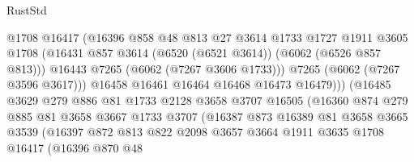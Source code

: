 \begin{lexlean}{RustStd}
\begin{coremodule}
                                @1708
                                @16417
                                (@16396
                                  @858
                                  @48
                                  @813
                                  @27
                                  @3614
                                  @1733
                                  @1727
                                  @1911
                                  @3605
                                  @1708
                                  (@16431
                                    @857
                                    @3614
                                    (@6520 (@6521 @3614))
                                    (@6062 (@6526 @857 @813)))
                                  @16443
                                  @7265
                                  (@6062 (@7267 @3606 @1733)))
                                @7265
                                (@6062 (@7267 @3596 @3617)))
                              @16458
                              @16461
                              @16464
                              @16468
                              @16473
                              @16479)))
                        (@16485
                          @3629
                          @279
                          @886
                          @81
                          @1733
                          @2128
                          @3658
                          @3707
                          @16505
                          (@16360
                            @874
                            @279
                            @885
                            @81
                            @3658
                            @3667
                            @1733
                            @3707
                            (@16387
                              @873
                              @16389
                              @81
                              @3658
                              @3665
                              @3539
                              (@16397
                                @872
                                @813
                                @822
                                @2098
                                @3657
                                @3664
                                @1911
                                @3635
                                @1708
                                @16417
                                (@16396
                                  @870
                                  @48

\end{coremodule}
\end{lexlean}
